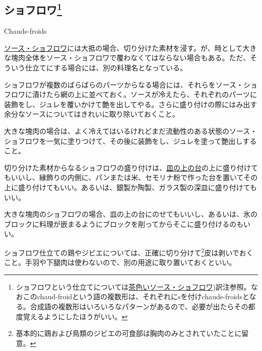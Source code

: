 \begin{main}
\hypertarget{chauds-froids}{%
\subsection[ショフロワ]{\texorpdfstring{ショフロワ\footnote{ショフロワという仕立てについては\protect\hyperlink{sauce-chaud-froid-brune}{茶色いソース・ショフロワ})訳注参照。なおこのchaud-froidという語の複数形は、それぞれにsを付けchauds-froidsとなる。合成語の複数形はいろいろなパターンがあるので、必要が出たらその都度覚えるようにしたほうがいい。}}{ショフロワ}}\label{chauds-froids}}

\begin{frsecbenv}

Chauds-froids

\end{frsecbenv}


\protect\hyperlink{sauce-chaud-froid-ordinaire}{ソース・ショフロワ}には大抵の場合、切り分けた素材を浸す。が、時として大きな塊肉全体をソース・ショフロワで覆わなくてはならない場合もある。ただ、そういう仕立てにする場合には、別の料理名となっている。

ショフロワが複数のばらばらのパーツからなる場合には、それらをソース・ショフロワに漬けたら網の上に並べておく。ソースが冷えたら、それぞれのパーツに装飾をし、ジュレを覆いかけて艶を出してやる。さらに盛り付けの際にはみ出す余分なソースについてはきれいに取り除いておくこと。

大きな塊肉の場合は、よく冷えてはいるけれどまだ流動性のある状態のソース・ショフロワを一気に塗りつけて、その後に装飾をし、ジュレを塗って艶出しすること。

切り分けた素材からなるショフロワの盛り付けは、\protect\hyperlink{fonds-de-plats}{皿の上の台}の上に盛り付けてもいいし、縁飾りの内側に、パンまたは米、セモリナ粉で作った台を置いてその上に盛り付けてもいい。あるいは、銀製か陶製、ガラス製の深皿に盛り付けてもいい。

大きな塊肉のショフロワの場合、皿の上の台にのせてもいいし、あるいは、氷のブロックに料理が嵌まるようにブロックを削ってからそこに盛り付けるのもいい。

ショフロワ仕立ての鶏やジビエについては、正確に切り分けて\footnote{基本的に鶏および鳥類のジビエの可食部は胸肉のみとされていたことに留意。}皮は剥いでおくこと。手羽や下腿肉は使わないので、別の用途に取り置いておくといい。


\end{main}
